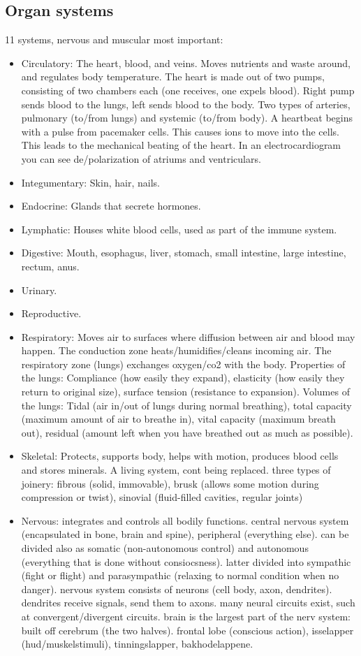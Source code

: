 \subsection{Organ systems}
11 systems, nervous and muscular most important:
\begin{itemize}
  \item Circulatory: The heart, blood, and veins. Moves nutrients and waste around, and regulates body temperature. The heart is made out of two pumps, consisting of two chambers each (one receives, one expels blood). Right pump sends blood to the lungs, left sends blood to the body. Two types of arteries, pulmonary (to/from lungs) and systemic (to/from body). A heartbeat begins with a pulse from pacemaker cells. This causes ions to move into the cells. This leads to the mechanical beating of the heart. In an electrocardiogram you can see de/polarization of atriums and ventriculars.
  \item Integumentary: Skin, hair, nails.
  \item Endocrine: Glands that secrete hormones.
  \item Lymphatic: Houses white blood cells, used as part of the immune system.
  \item Digestive: Mouth, esophagus, liver, stomach, small intestine, large intestine, rectum, anus.
  \item Urinary.
  \item Reproductive.
  \item Respiratory: Moves air to surfaces where diffusion between air and blood may happen. The conduction zone heats/humidifies/cleans incoming air. The respiratory zone (lungs) exchanges oxygen/co2 with the body. Properties of the lungs: Compliance (how easily they expand), elasticity (how easily they return to original size), surface tension (resistance to expansion). Volumes of the lungs: Tidal (air in/out of lungs during normal breathing), total capacity (maximum amount of air to breathe in), vital capacity (maximum breath out), residual (amount left when you have breathed out as much as possible).
  \item Skeletal: Protects, supports body, helps with motion, produces blood cells and stores minerals. A living system, cont being replaced.
    three types of joinery: fibrous (solid, immovable), brusk (allows some motion during compression or twist), sinovial (fluid-filled cavities, regular joints)
  \item Nervous: integrates and controls all bodily functions. central nervous system (encapsulated in bone, brain and spine), peripheral (everything else). can be divided also as somatic (non-autonomous control) and autonomous (everything that is done without consiocsness). latter divided into sympathic (fight or flight) and parasympathic (relaxing to normal condition when no danger). nervous system consists of neurons (cell body, axon, dendrites). dendrites receive signals, send them to axons. many neural circuits exist, such at convergent/divergent circuits. brain is the largest part of the nerv system: built off cerebrum (the two halves). frontal lobe (conscious action), isselapper (hud/muskelstimuli), tinningslapper, bakhodelappene.

\end{itemize}
